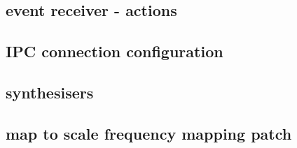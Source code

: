 \documentclass[11pt]{article}
\begin{document}
\subsection{event receiver - actions}
\label{sec:orgfa0cea3}
\subsection{IPC connection configuration}
\label{sec:orgcc09955}
\subsection{synthesisers}
\label{sec:orgb25d361}
\subsection{map to scale frequency mapping patch}
\label{sec:orga1cbe34}
\end{document}
